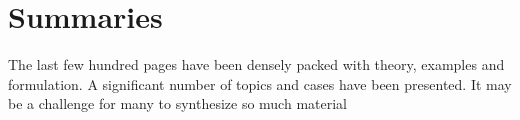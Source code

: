 \chapter{Summaries}

The last few hundred pages have been densely packed with theory, examples and formulation. A significant number of topics and cases have been presented. It may be a challenge for many to synthesize so much material





\endinput